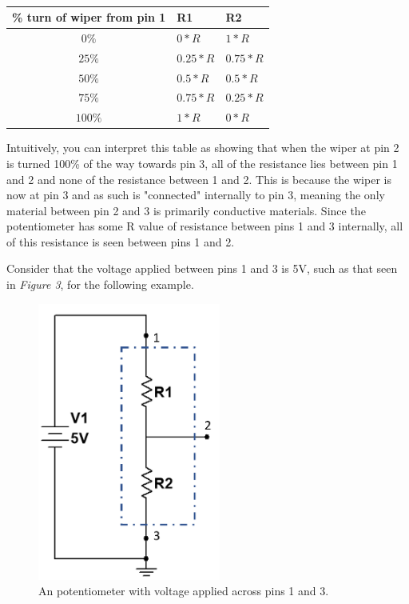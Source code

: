 \documentclass[12pt]{article}
\begin{document}
\begin{table}[H]
    \centering
    \begin{tabular}{|c||l|l|}
        \hline
        \% turn of wiper from pin 1 & R1 & R2  \\ \hline \hline
        $0\%$                       & $0*R$   & $1*R$     \\ \hline
        $25\%$                      & $0.25*R$   & $0.75*R$     \\ \hline
        $50\%$                      & $0.5*R$   & $0.5*R$     \\ \hline
        $75\%$                      & $0.75*R$  & $0.25*R$     \\ \hline
        $100\%$                     & $1*R$   & $0*R$     \\ \hline
    \end{tabular}
    \caption{}
\end{table}

Intuitively, you can interpret this table as showing that when the wiper at pin 2 is turned 100\% of the way towards pin 3, all of the resistance lies between pin 1 and 2 and none of the resistance between 1 and 2. This is because the wiper is now at pin 3 and as such is "connected" internally to pin 3, meaning the only material between pin 2 and 3 is primarily conductive materials. Since the potentiometer has some R value of resistance between pins 1 and 3 internally, all of this resistance is seen between pins 1 and 2.

Consider that the voltage applied between pins 1 and 3 is 5V, such as that seen in \textit{Figure 3}, for the following example.

\begin{figure}[H]
    \centering
    \includegraphics[width=6cm]{photos/prelim/voltagedivider.PNG}
    \caption{An potentiometer with voltage applied across pins 1 and 3.}
\end{figure}
\end{document}
